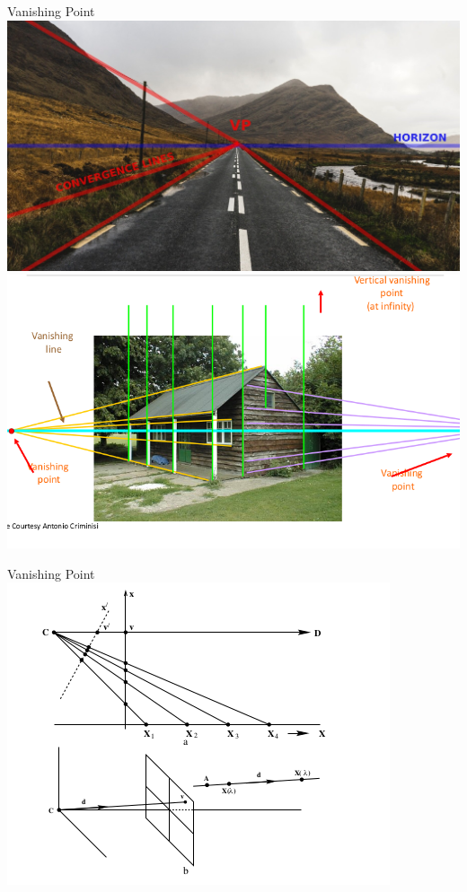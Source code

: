\documentclass{beamer}
\begin{document}
  \begin{frame}{Vanishing Point}
    \includegraphics[width=0.7\linewidth]{media/vanishing-lines.jpeg}
    \\
    \includegraphics[width=0.7\linewidth]{media/vanishing-points.png}
  \end{frame}

  \begin{frame}{Vanishing Point}
    \includegraphics[width=0.5\linewidth]{media/vanishing-point-formation.png}
  \end{frame}
\end{document}
